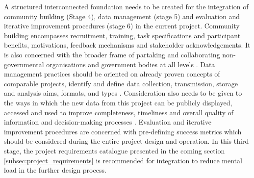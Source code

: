 A structured interconnected foundation needs to be created for the integration of community building (Stage 4), data management (stage 5) and evaluation and iterative improvement procedures (stage 6) in the current project. Community building encompasses recruitment, training, task specifications and participant benefits, motivations, feedback mechanisms and stakeholder acknowledgements. It is also concerned with the broader frame of partaking and collaborating non-governmental organisations and government bodies at all levels \autocite{conradReviewCitizenScience2011}. Data management practices should be oriented on already proven concepts of comparable projects, identify and define data collection, transmission, storage and analysis aims, formats, and types \autocite{fraislCitizenScienceEnvironmental2022,gualazziniEWEAEarlyWarning2021,ifrcCommunityBasedSurveillanceGuiding2017}. Consideration also needs to be given to the ways in which the new data from this project can be publicly displayed, accessed and used to improve completeness, timeliness and overall quality of information and decision-making processes \autocite{conradMeaningfulCommunityBasedEcological2006}. Evaluation and iterative improvement procedures are concerned with pre-defining success metrics which should be considered during the entire project design and operation.\newline
In this third stage, the project requirements catalogue presented in the coming section \ref*{subsec:project_requirements} is recommended for integration to reduce mental load in the further design process.

